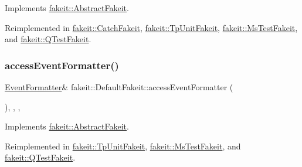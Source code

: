 Implements \mbox{\hyperlink{classfakeit_1_1AbstractFakeit_a443a7ac12208c55f2ae4fa072e983476}{fakeit\+::\+Abstract\+Fakeit}}.



Reimplemented in \mbox{\hyperlink{classfakeit_1_1CatchFakeit_aaadf534923d2255186e3a13446828b05}{fakeit\+::\+Catch\+Fakeit}}, \mbox{\hyperlink{classfakeit_1_1TpUnitFakeit_ae0f3713842b30e36ee1b0ce03a070b59}{fakeit\+::\+Tp\+Unit\+Fakeit}}, \mbox{\hyperlink{classfakeit_1_1MsTestFakeit_ad4e89ab859aa132a1f35fc0fea7d05a2}{fakeit\+::\+Ms\+Test\+Fakeit}}, and \mbox{\hyperlink{classfakeit_1_1QTestFakeit_a3760d57c61ed1572bcf5cded00f643ec}{fakeit\+::\+Q\+Test\+Fakeit}}.

\mbox{\label{classfakeit_1_1DefaultFakeit_a02cb8f08a94e7bf830c87f74f20c9bd9}} 
\subsubsection{\texorpdfstring{accessEventFormatter()}{accessEventFormatter()}\hspace{0.1cm}{\footnotesize\ttfamily [5/9]}}
{\footnotesize\ttfamily \mbox{\hyperlink{structfakeit_1_1EventFormatter}{Event\+Formatter}}\& fakeit\+::\+Default\+Fakeit\+::access\+Event\+Formatter (\begin{DoxyParamCaption}{ }\end{DoxyParamCaption})\hspace{0.3cm}{\ttfamily [inline]}, {\ttfamily [override]}, {\ttfamily [protected]}, {\ttfamily [virtual]}}



Implements \mbox{\hyperlink{classfakeit_1_1AbstractFakeit_a443a7ac12208c55f2ae4fa072e983476}{fakeit\+::\+Abstract\+Fakeit}}.



Reimplemented in \mbox{\hyperlink{classfakeit_1_1TpUnitFakeit_ae0f3713842b30e36ee1b0ce03a070b59}{fakeit\+::\+Tp\+Unit\+Fakeit}}, \mbox{\hyperlink{classfakeit_1_1MsTestFakeit_ad4e89ab859aa132a1f35fc0fea7d05a2}{fakeit\+::\+Ms\+Test\+Fakeit}}, and \mbox{\hyperlink{classfakeit_1_1QTestFakeit_a3760d57c61ed1572bcf5cded00f643ec}{fakeit\+::\+Q\+Test\+Fakeit}}.

\mbox{\label{classfakeit_1_1DefaultFakeit_a02cb8f08a94e7bf830c87f74f20c9bd9}} 
